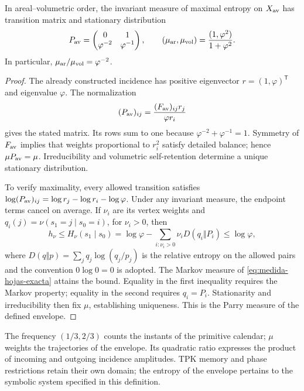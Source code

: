 \begin{proposition}
In areal--volumetric order, the invariant measure of maximal entropy
on \(X_{\rm av}\) has transition matrix and stationary distribution
\begin{equation}
 P_{\rm av}=\begin{pmatrix}0&1\\\varphi^{-2}&\varphi^{-1}\end{pmatrix},
 \qquad
 (\mu_{\rm ar},\mu_{\rm vol})
 =\frac{(1,\varphi^2)}{1+\varphi^2}.
 \label{eq:medida-hojas-exacta}
\end{equation}
In particular, \(\mu_{\rm ar}/\mu_{\rm vol}=\varphi^{-2}\).
\end{proposition}
\begin{proof}
The already constructed incidence has positive eigenvector
\(r=(1,\varphi)^{\mathsf T}\) and eigenvalue \(\varphi\). The
normalization
\[
 (P_{\rm av})_{ij}
 =\frac{(F_{\rm av})_{ij}r_j}{\varphi r_i}
\]
gives the stated matrix. Its rows sum to one because
\(\varphi^{-2}+\varphi^{-1}=1\). Symmetry of \(F_{\rm av}\)
implies that weights proportional to \(r_i^2\) satisfy detailed
balance; hence \(\mu P_{\rm av}=\mu\). Irreducibility and
volumetric self-retention determine a unique stationary distribution.

To verify maximality, every allowed transition satisfies
\(\log(P_{\rm av})_{ij}=\log r_j-\log r_i-\log\varphi\).
Under any invariant measure, the endpoint terms cancel
on average. If \(\nu_i\) are its vertex weights and
\(q_i(j)=\nu(s_1=j\mid s_0=i)\), for \(\nu_i>0\), then
\[
 h_\nu\leq H_\nu(s_1\mid s_0)
 =\log\varphi-\sum_{i:\nu_i>0}\nu_iD(q_i\Vert P_i)
 \leq\log\varphi,
\]
where \(D(q\Vert p)=\sum_jq_j\log(q_j/p_j)\) is the relative
entropy on the allowed pairs and the convention \(0\log0=0\) is adopted.
The Markov measure of \eqref{eq:medida-hojas-exacta} attains the bound.
Equality in the first inequality requires the Markov property;
equality in the second requires \(q_i=P_i\). Stationarity and
irreducibility then fix \(\mu\), establishing
uniqueness. This is the Parry measure of the defined envelope.
\end{proof}

The frequency \((1/3,2/3)\) counts the instants of the primitive calendar;
\(\mu\) weights the trajectories of the envelope. Its quadratic ratio
expresses the product of incoming and outgoing incidence amplitudes.
TPK memory and phase restrictions retain their own
domain; the entropy of the envelope pertains to the symbolic system
specified in this definition.

